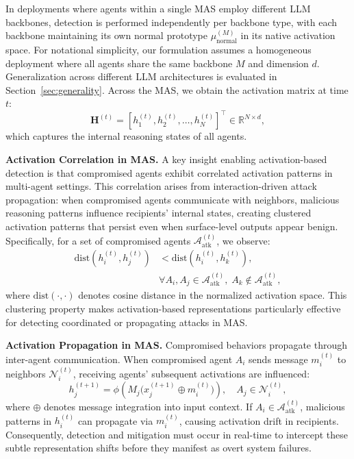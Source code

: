 \documentclass{article}
\theoremstyle{plain}
\theoremstyle{definition}
\theoremstyle{remark}
\begin{document}
In deployments where agents within a single MAS employ different 
LLM backbones, detection is performed independently per backbone 
type, with each backbone maintaining its own normal prototype 
$\mu_{\text{normal}}^{(M)}$ in its native activation space. 
For notational simplicity, our formulation assumes a homogeneous 
deployment where all agents share the same backbone $M$ and 
dimension $d$. Generalization across different LLM architectures 
is evaluated in Section~\ref{sec:generality}.
Across the MAS, we obtain the activation matrix at time $t$:
\begin{equation}
\mathbf{H}^{(t)} = [h_1^{(t)}, h_2^{(t)}, \ldots, h_N^{(t)}]^\top \in \mathbb{R}^{N \times d},
\end{equation}
which captures the internal reasoning states of all agents.

\noindent\textbf{Activation Correlation in MAS.}
A key insight enabling activation-based detection is that compromised agents 
exhibit correlated activation patterns in multi-agent settings.
This correlation arises from interaction-driven attack propagation: when 
compromised agents communicate with neighbors, malicious reasoning patterns 
influence recipients' internal states, creating clustered activation 
patterns that persist even when surface-level outputs appear benign.
Specifically, for a set of compromised agents
$\mathcal{A}_{\mathrm{atk}}^{(t)}$, we observe:
\begin{equation}
\begin{aligned}
\text{dist}\!\left(h_i^{(t)}, h_j^{(t)}\right)
&< \text{dist}\!\left(h_i^{(t)}, h_k^{(t)}\right), \\
&\forall A_i, A_j \in \mathcal{A}_{\mathrm{atk}}^{(t)},\;
A_k \notin \mathcal{A}_{\mathrm{atk}}^{(t)},
\end{aligned}
\end{equation}
where $\text{dist}(\cdot, \cdot)$ denotes cosine distance in the normalized
activation space.
This clustering property makes activation-based representations particularly
effective for detecting coordinated or propagating attacks in MAS.

\noindent\textbf{Activation Propagation in MAS.}
Compromised behaviors propagate through inter-agent communication.
When compromised agent $A_i$ sends message $m_i^{(t)}$ to neighbors 
$\mathcal{N}_i^{(t)}$, receiving agents' subsequent activations are influenced:
\begin{equation}
h_j^{(t+1)} = \phi\!\left(M_j\big(x_j^{(t+1)} \oplus m_i^{(t)}\big)\right), 
\quad A_j \in \mathcal{N}_i^{(t)},
\end{equation}
where $\oplus$ denotes message integration into input context.
If $A_i \in \mathcal{A}_{\mathrm{atk}}^{(t)}$, malicious patterns in $h_i^{(t)}$
can propagate via $m_i^{(t)}$, causing activation drift in recipients.
Consequently, detection and mitigation must occur in real-time to intercept these subtle representation shifts before they manifest as overt system failures.
\end{document}

